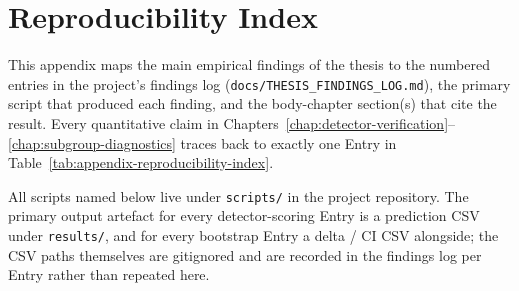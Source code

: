 \cleardoubleoddpage
\chapter{Reproducibility Index}
\label{app:reproducibility}

This appendix maps the main empirical findings of the thesis to
the numbered entries in the project's findings log
(\texttt{docs/THESIS\_FINDINGS\_LOG.md}), the primary script that
produced each finding, and the body-chapter section(s) that cite
the result. Every quantitative claim in Chapters~\ref{chap:detector-verification}--\ref{chap:subgroup-diagnostics} traces
back to exactly one Entry in Table~\ref{tab:appendix-reproducibility-index}.

All scripts named below live under \texttt{scripts/} in the
project repository. The primary output artefact for every
detector-scoring Entry is a prediction CSV under \texttt{results/},
and for every bootstrap Entry a delta / CI CSV alongside; the CSV
paths themselves are gitignored and are recorded in the findings
log per Entry rather than repeated here.


